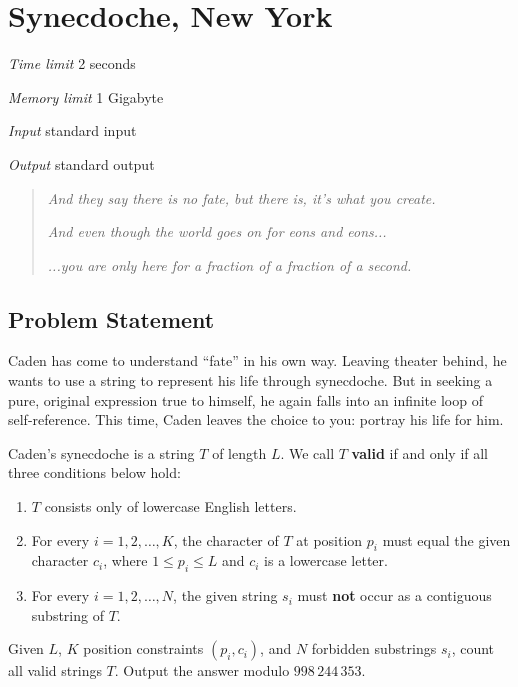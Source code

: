 \section[A. Synecdoche, New York]{ Synecdoche, New York}

\textit{Time limit}   2 seconds

\textit{Memory limit} 1 Gigabyte

\textit{Input} \qquad standard input

\textit{Output} \qquad standard output


\begin{quote}
	\textit{And they say there is no fate, but there is, it's what you create.}

	\textit{And even though the world goes on for eons and eons...}

	\textit{...you are only here for a fraction of a fraction of a second.}
\end{quote}

\subsection{Problem Statement}

Caden has come to understand ``fate'' in his own way. Leaving theater behind, he wants to use a string to represent his life through synecdoche. But in seeking a pure, original expression true to himself, he again falls into an infinite loop of self-reference. This time, Caden leaves the choice to you: portray his life for him.

Caden's synecdoche is a string $T$ of length $L$. We call $T$ \textbf{valid} if and only if all three conditions below hold:

\begin{enumerate}
	\item $T$ consists only of lowercase English letters.
	\item For every $i = 1, 2, \ldots, K$, the character of $T$ at position $p_i$ must equal the given character $c_i$, where $1 \le p_i \le L$ and $c_i$ is a lowercase letter.
	\item For every $i = 1, 2, \ldots, N$, the given string $s_i$ must \textbf{not} occur as a contiguous substring of $T$.
\end{enumerate}

Given $L$, $K$ position constraints $(p_i,c_i)$, and $N$ forbidden substrings $s_i$, count all valid strings $T$. Output the answer modulo $998\,244\,353$.

